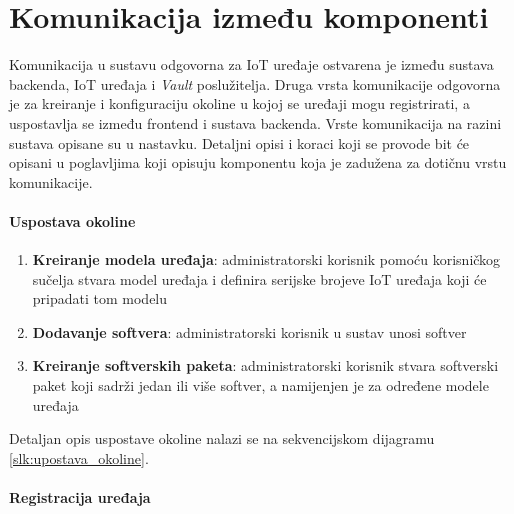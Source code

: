 \documentclass[zavrsnirad]{fer}
\begin{document}
	
	\section{Komunikacija između komponenti}
	\label{arh_sus:komunikacija}
	
	Komunikacija u sustavu odgovorna za IoT uređaje ostvarena je između sustava backenda, IoT uređaja i \textit{Vault} poslužitelja. Druga vrsta komunikacije odgovorna je za kreiranje i konfiguraciju okoline u kojoj se uređaji mogu registrirati, a uspostavlja se između frontend i sustava backenda. Vrste komunikacija na razini sustava opisane su u nastavku. Detaljni opisi i koraci koji se provode bit će opisani u poglavljima koji opisuju komponentu koja je zadužena za dotičnu vrstu komunikacije.
	
	\paragraph{Uspostava okoline}
	
	\begin{enumerate}
		\item \textbf{Kreiranje modela uređaja}: administratorski korisnik pomoću korisničkog sučelja stvara model uređaja i definira serijske brojeve IoT uređaja koji će pripadati tom modelu
		\item \textbf{Dodavanje softvera}: administratorski korisnik u sustav unosi softver
		\item \textbf{Kreiranje softverskih paketa}: administratorski korisnik stvara softverski paket koji sadrži jedan ili više softver, a namijenjen je za određene modele uređaja
	\end{enumerate}
	
	Detaljan opis uspostave okoline nalazi se na sekvencijskom dijagramu \ref{slk:upostava_okoline}.
	
	
	\paragraph{Registracija uređaja}
	
\end{document}
